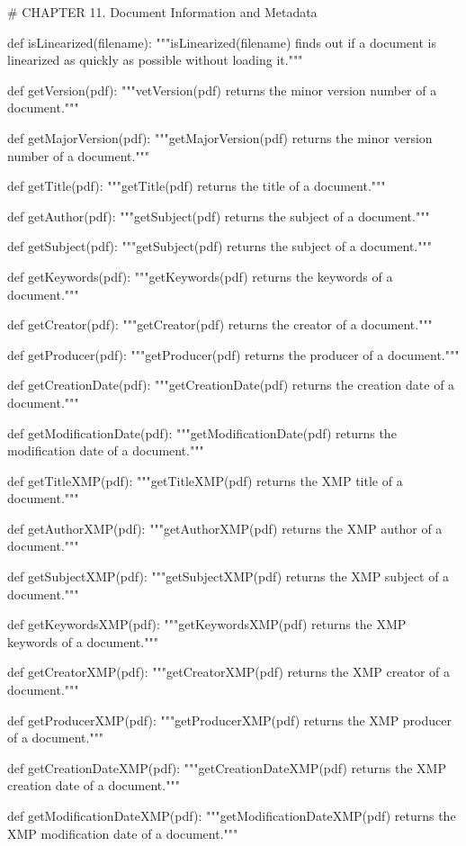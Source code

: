 # CHAPTER 11. Document Information and Metadata

def isLinearized(filename):
    """isLinearized(filename) finds out if a document is linearized as quickly
    as possible without loading it."""

def getVersion(pdf):
    """vetVersion(pdf) returns the minor version number of a document."""

def getMajorVersion(pdf):
    """getMajorVersion(pdf) returns the minor version number of a document."""

def getTitle(pdf):
    """getTitle(pdf) returns the title of a document."""

def getAuthor(pdf):
    """getSubject(pdf) returns the subject of a document."""

def getSubject(pdf):
    """getSubject(pdf) returns the subject of a document."""

def getKeywords(pdf):
    """getKeywords(pdf) returns the keywords of a document."""

def getCreator(pdf):
    """getCreator(pdf) returns the creator of a document."""

def getProducer(pdf):
    """getProducer(pdf) returns the producer of a document."""

def getCreationDate(pdf):
    """getCreationDate(pdf) returns the creation date of a document."""

def getModificationDate(pdf):
    """getModificationDate(pdf) returns the modification date of a document."""

def getTitleXMP(pdf):
    """getTitleXMP(pdf) returns the XMP title of a document."""

def getAuthorXMP(pdf):
    """getAuthorXMP(pdf) returns the XMP author of a document."""

def getSubjectXMP(pdf):
    """getSubjectXMP(pdf) returns the XMP subject of a document."""

def getKeywordsXMP(pdf):
    """getKeywordsXMP(pdf) returns the XMP keywords of a document."""

def getCreatorXMP(pdf):
    """getCreatorXMP(pdf) returns the XMP creator of a document."""

def getProducerXMP(pdf):
    """getProducerXMP(pdf) returns the XMP producer of a document."""

def getCreationDateXMP(pdf):
    """getCreationDateXMP(pdf) returns the XMP creation date of a document."""

def getModificationDateXMP(pdf):
    """getModificationDateXMP(pdf) returns the XMP modification date of a
    document."""

